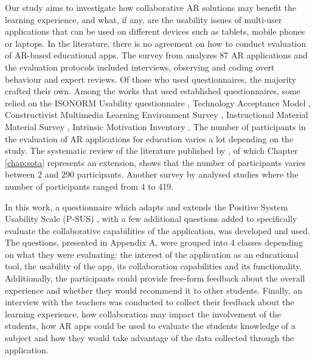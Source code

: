 Our study aims to investigate how collaborative AR solutions may benefit the learning experience, and what, if any, are the usability issues of multi-user applications that can be used on different devices such as tablets, mobile phones or laptops.
In the literature, there is no agreement on how to conduct evaluation of AR-based educational apps.
The survey from \cite{santos2013augmented} analyzes 87 AR applications and the evaluation protocols included interviews, observing and coding overt behaviour and expert reviews.
Of those who used questionnaires, the majority crafted their own.
Among the works that used established questionnaires, some relied on the ISONORM Usability questionnaire \citep{prumper1999test}, Technology Acceptance Model \citep{davis1996critical}, Constructivist Multimedia Learning Environment Survey \citep{maor1999teacher}, Instructional Material Material Survey \citep{keller1987development}, Intrinsic Motivation Inventory \citep{ryan2000self}.
The number of participants in the evaluation of AR applications for education varies a lot depending on the study.
The systematic review of the literature published by \cite{masneri2020work}, of which Chapter \ref{chap:sota} represents an extension, shows that the number of participants varies between 2 and 290 participants. Another survey by \cite{santos2013augmented} analysed studies where the number of participants ranged from 4 to 419.

In this work, a questionnaire which adapts and extends the Positive System Usability Scale (P-SUS) \citep{brooke1996sus, sauro2011designing}, with a few additional questions added to specifically evaluate the collaborative capabilities of the application, was developed and used.
The questions, presented in Appendix A, were grouped into 4 classes depending on what they were evaluating: the interest of the application as an educational tool, the usability of the app, its collaboration capabilities and its functionality.
Additionally, the participants could provide free-form feedback about the overall experience and whether they would recommend it to other students.
Finally, an interview with the teachers was conducted to collect their feedback about the learning experience, how collaboration may impact the involvement of the students, how  AR apps could be used to evaluate the students knowledge of a subject and how they would take advantage of the data collected through the application.

